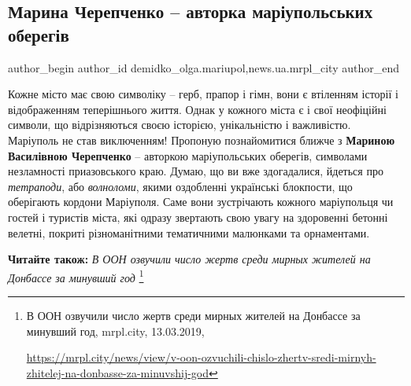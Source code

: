  
 
 
 
 
 
\subsection{Марина Черепченко – авторка маріупольських оберегів}
\label{sec:13_03_2019.stz.news.ua.mrpl_city.1.maryna_cherepchenko_avtorka_oberegy}
 
\ifcmt
 author_begin
   author_id demidko_olga.mariupol,news.ua.mrpl_city
 author_end
\fi


Кожне місто має свою символіку – герб, прапор і гімн, вони є втіленням історії
і відображенням теперішнього життя. Однак у кожного міста є і свої неофіційні
символи, що відрізняються своєю історією, унікальністю і важливістю. Маріуполь
не став виключенням! Пропоную познайомитися ближче з \textbf{Мариною Василівною
Черепченко} – авторкою маріупольських оберегів, символами незламності
приазовського краю. Думаю, що ви вже здогадалися, йдеться про \emph{тетраподи}, або
\emph{волноломи}, якими оздобленні українські блокпости, що оберігають кордони
Маріуполя. Саме вони зустрічають кожного маріупольця чи гостей і туристів
міста, які одразу звертають свою увагу на здоровенні бетонні велетні, покриті
різноманітними тематичними малюнками та орнаментами.


\textbf{Читайте також:} \emph{В ООН озвучили число жертв среди мирных жителей на Донбассе за минувший год}%
\footnote{В ООН озвучили число жертв среди мирных жителей на Донбассе за минувший год, mrpl.city, 13.03.2019, \par\url{https://mrpl.city/news/view/v-oon-ozvuchili-chislo-zhertv-sredi-mirnyh-zhitelej-na-donbasse-za-minuvshij-god}}


